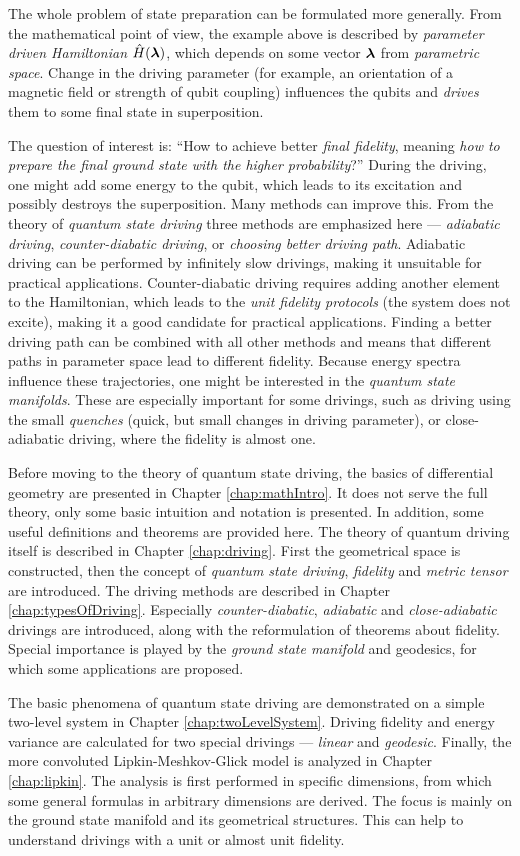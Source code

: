 The whole problem of state preparation can be formulated more generally. From the mathematical point of view, the example above is described by \emph{parameter driven Hamiltonian} $\hat{H}({\bm\lambda})$, which depends on some vector ${\bm\lambda}$ from \emph{parametric space}. Change in the driving parameter (for example, an orientation of a magnetic field or strength of qubit coupling) influences the qubits and \emph{drives} them to some final state in superposition.

The question of interest is: “How to achieve better \emph{final fidelity}, meaning \emph{how to prepare the final ground state with the higher probability}?” During the driving, one might add some energy to the qubit, which leads to its excitation and possibly destroys the superposition. Many methods can improve this. From the theory of \emph{quantum state driving} three methods are emphasized here — \emph{adiabatic driving}, \emph{counter-diabatic driving}, or \emph{choosing better driving path}. Adiabatic driving can be performed by infinitely slow drivings, making it unsuitable for practical applications. Counter-diabatic driving requires adding another element to the Hamiltonian, which leads to the \emph{unit fidelity protocols} (the system does not excite), making it a good candidate for practical applications. Finding a better driving path can be combined with all other methods and means that different paths in parameter space lead to different fidelity. Because energy spectra influence these trajectories, one might be interested in the \emph{quantum state manifolds}. These are especially important for some drivings, such as driving using the small \emph{quenches} (quick, but small changes in driving parameter), or close-adiabatic driving, where the fidelity is almost one.

Before moving to the theory of quantum state driving, the basics of differential geometry are presented in Chapter \ref{chap:mathIntro}. It does not serve the full theory, only some basic intuition and notation is presented. In addition, some useful definitions and theorems are provided here. The theory of quantum driving itself is described in Chapter \ref{chap:driving}. First the geometrical space is constructed, then the concept of \emph{quantum state driving}, \emph{fidelity} and \emph{metric tensor} are introduced.
The driving methods are described in Chapter \ref{chap:typesOfDriving}. Especially \emph{counter-diabatic}, \emph{adiabatic} and \emph{close-adiabatic} drivings are introduced, along with the reformulation of theorems about fidelity. Special importance is played by the \emph{ground state manifold} and geodesics, for which some applications are proposed.

The basic phenomena of quantum state driving are demonstrated on a simple two-level system in Chapter \ref{chap:twoLevelSystem}. Driving fidelity and energy variance are calculated for two special drivings — \emph{linear} and \emph{geodesic}. Finally, the more convoluted Lipkin-Meshkov-Glick model is analyzed in Chapter \ref{chap:lipkin}. The analysis is first performed in specific dimensions, from which some general formulas in arbitrary dimensions are derived. The focus is mainly on the ground state manifold and its geometrical structures. This can help to understand drivings with a unit or almost unit fidelity.